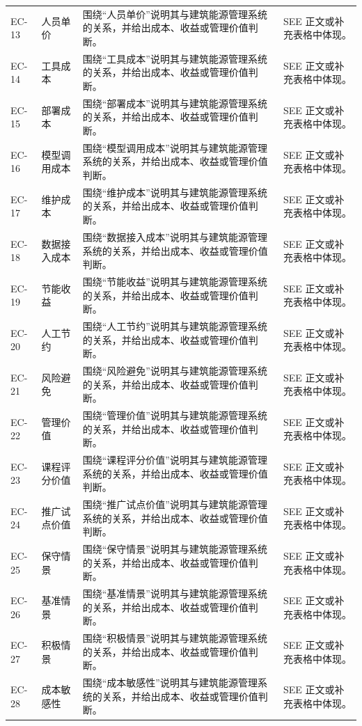 \documentclass[12pt,a4paper]{ctexart}
\begin{document}
\begin{longtable}{L{1.8cm}L{3.3cm}L{6.2cm}L{4.0cm}}
EC-13 & 人员单价 & 围绕“人员单价”说明其与建筑能源管理系统的关系，并给出成本、收益或管理价值判断。 & SEE 正文或补充表格中体现。 \\
EC-14 & 工具成本 & 围绕“工具成本”说明其与建筑能源管理系统的关系，并给出成本、收益或管理价值判断。 & SEE 正文或补充表格中体现。 \\
EC-15 & 部署成本 & 围绕“部署成本”说明其与建筑能源管理系统的关系，并给出成本、收益或管理价值判断。 & SEE 正文或补充表格中体现。 \\
EC-16 & 模型调用成本 & 围绕“模型调用成本”说明其与建筑能源管理系统的关系，并给出成本、收益或管理价值判断。 & SEE 正文或补充表格中体现。 \\
EC-17 & 维护成本 & 围绕“维护成本”说明其与建筑能源管理系统的关系，并给出成本、收益或管理价值判断。 & SEE 正文或补充表格中体现。 \\
EC-18 & 数据接入成本 & 围绕“数据接入成本”说明其与建筑能源管理系统的关系，并给出成本、收益或管理价值判断。 & SEE 正文或补充表格中体现。 \\
EC-19 & 节能收益 & 围绕“节能收益”说明其与建筑能源管理系统的关系，并给出成本、收益或管理价值判断。 & SEE 正文或补充表格中体现。 \\
EC-20 & 人工节约 & 围绕“人工节约”说明其与建筑能源管理系统的关系，并给出成本、收益或管理价值判断。 & SEE 正文或补充表格中体现。 \\
EC-21 & 风险避免 & 围绕“风险避免”说明其与建筑能源管理系统的关系，并给出成本、收益或管理价值判断。 & SEE 正文或补充表格中体现。 \\
EC-22 & 管理价值 & 围绕“管理价值”说明其与建筑能源管理系统的关系，并给出成本、收益或管理价值判断。 & SEE 正文或补充表格中体现。 \\
EC-23 & 课程评分价值 & 围绕“课程评分价值”说明其与建筑能源管理系统的关系，并给出成本、收益或管理价值判断。 & SEE 正文或补充表格中体现。 \\
EC-24 & 推广试点价值 & 围绕“推广试点价值”说明其与建筑能源管理系统的关系，并给出成本、收益或管理价值判断。 & SEE 正文或补充表格中体现。 \\
EC-25 & 保守情景 & 围绕“保守情景”说明其与建筑能源管理系统的关系，并给出成本、收益或管理价值判断。 & SEE 正文或补充表格中体现。 \\
EC-26 & 基准情景 & 围绕“基准情景”说明其与建筑能源管理系统的关系，并给出成本、收益或管理价值判断。 & SEE 正文或补充表格中体现。 \\
EC-27 & 积极情景 & 围绕“积极情景”说明其与建筑能源管理系统的关系，并给出成本、收益或管理价值判断。 & SEE 正文或补充表格中体现。 \\
EC-28 & 成本敏感性 & 围绕“成本敏感性”说明其与建筑能源管理系统的关系，并给出成本、收益或管理价值判断。 & SEE 正文或补充表格中体现。 \\

\end{longtable}
\end{document}

